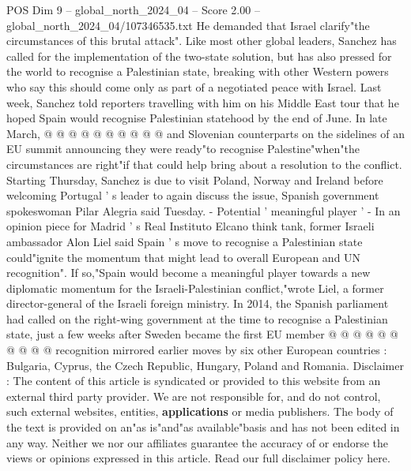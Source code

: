 \begin{textsample}{POS Dim 9 – global\_north\_2024\_04 – Score 2.00 – global\_north\_2024\_04/107346535.txt}
He demanded that Israel clarify"the circumstances of this brutal attack".
Like most other global leaders, Sanchez has called for the implementation of the two-state solution, but has also pressed for the world to recognise a Palestinian state, breaking with other Western powers who say this should come only as part of a negotiated peace with Israel.
Last week, Sanchez told reporters travelling with him on his Middle East tour that he hoped Spain would recognise Palestinian statehood by the end of June.
In late March, @ @ @ @ @ @ @ @ @ @ and Slovenian counterparts on the sidelines of an EU summit announcing they were ready"to recognise Palestine"when"the circumstances are right"if that could help bring about a resolution to the conflict.
Starting Thursday, Sanchez is due to visit Poland, Norway and Ireland before welcoming Portugal ' s leader to again discuss the issue, Spanish government spokeswoman Pilar Alegria said Tuesday. - Potential ' meaningful player ' - In an opinion piece for Madrid ' s Real Instituto Elcano think tank, former Israeli ambassador Alon Liel said Spain ' s move to recognise a Palestinian state could"ignite the momentum that might lead to overall European and UN recognition".
If so,"Spain would become a meaningful player towards a new diplomatic momentum for the Israeli-Palestinian conflict,"wrote Liel, a former director-general of the Israeli foreign ministry.
In 2014, the Spanish parliament had called on the right-wing government at the time to recognise a Palestinian state, just a few weeks after Sweden became the first EU member @ @ @ @ @ @ @ @ @ @ recognition mirrored earlier moves by six other European countries : Bulgaria, Cyprus, the Czech Republic, Hungary, Poland and Romania.
Disclaimer : The content of this article is syndicated or provided to this website from an external third party provider.
We are not responsible for, and do not control, such external websites, entities, \textbf{applications} or media publishers.
The body of the text is provided on an"as is"and"as available"basis and has not been edited in any way.
Neither we nor our affiliates guarantee the accuracy of or endorse the views or opinions expressed in this article.
Read our full disclaimer policy here.

\end{textsample}
